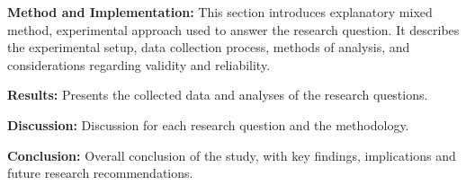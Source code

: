 \textbf{Method and Implementation:} This section introduces explanatory mixed method, experimental approach used to answer the research question. It describes the experimental setup, data collection process, methods of analysis, and considerations regarding validity and reliability.   

\textbf{Results:} Presents the collected data and analyses of the research questions. 

\textbf{Discussion:} Discussion for each research question and the methodology. 

\textbf{Conclusion:} Overall conclusion of the study, with key findings, implications and future research recommendations.  




